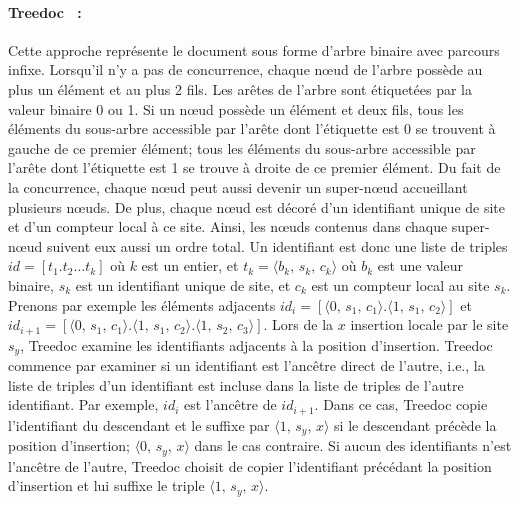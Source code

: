 \paragraph{Treedoc~\cite{letia2009crdts, preguica2009commutative} :} Cette
approche représente le document sous forme d'arbre binaire avec parcours infixe.
Lorsqu'il n'y a pas de concurrence, chaque nœud de l'arbre possède au plus un
élément et au plus 2 fils. Les arêtes de l'arbre sont étiquetées par la valeur
binaire 0 ou 1.  Si un nœud possède un élément et deux fils, tous les éléments
du sous-arbre accessible par l'arête dont l'étiquette est 0 se trouvent à gauche
de ce premier élément; tous les éléments du sous-arbre accessible par l'arête
dont l'étiquette est 1 se trouve à droite de ce premier élément. Du fait de la
concurrence, chaque nœud peut aussi devenir un super-nœud accueillant plusieurs
nœuds. De plus, chaque nœud est décoré d'un identifiant unique de site et d'un
compteur local à ce site. Ainsi, les nœuds contenus dans chaque super-nœud
suivent eux aussi un ordre total. Un identifiant est donc une liste de triples
$id = [t_1.t_2\ldots t_k]$ où $k$ est un entier, et
$t_k = \langle b_k,\, s_k,\, c_k\rangle$ où $b_k$ est une valeur binaire, $s_k$
est un identifiant unique de site, et $c_k$ est un compteur local au site $s_k$.
Prenons par exemple les éléments adjacents
$id_i=[\langle 0,\,s_1,\,c_1 \rangle.\langle 1,\,s_1,\,c_2 \rangle]$ et
$id_{i+1}=[\langle 0,\,s_1,\,c_1 \rangle.\langle 1,\,s_1,\,c_2 \rangle. \langle
1,\, s_2,\, c_3 \rangle]$.
Lors de la $x$ insertion locale par le site $s_y$, Treedoc examine les
identifiants adjacents à la position d'insertion. Treedoc commence par examiner
si un identifiant est l'ancêtre direct de l'autre, i.e., la liste de triples
d'un identifiant est incluse dans la liste de triples de l'autre
identifiant. Par exemple, $id_{i}$ est l'ancêtre de $id_{i+1}$. Dans ce cas,
Treedoc copie l'identifiant du descendant et le suffixe par
$\langle 1,\, s_y,\, x \rangle$ si le descendant précède la position
d'insertion; $\langle 0,\, s_y,\, x \rangle$ dans le cas contraire. Si aucun des
identifiants n'est l'ancêtre de l'autre, Treedoc choisit de copier l'identifiant
précédant la position d'insertion et lui suffixe le triple
$\langle 1,\, s_y,\, x \rangle$.


